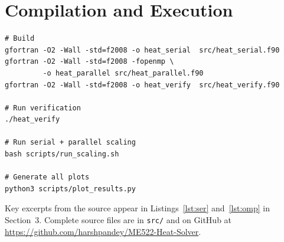 \documentclass[12pt,a4paper]{article}
\begin{document}
\appendix
\section{Compilation and Execution}
\begin{verbatim}
# Build
gfortran -O2 -Wall -std=f2008 -o heat_serial  src/heat_serial.f90
gfortran -O2 -Wall -std=f2008 -fopenmp \
         -o heat_parallel src/heat_parallel.f90
gfortran -O2 -Wall -std=f2008 -o heat_verify  src/heat_verify.f90

# Run verification
./heat_verify

# Run serial + parallel scaling
bash scripts/run_scaling.sh

# Generate all plots
python3 scripts/plot_results.py
\end{verbatim}

Key excerpts from the source appear in Listings~\ref{lst:ser}
and~\ref{lst:omp} in Section~3. Complete source files are in \texttt{src/}
and on GitHub at \url{https://github.com/harshpandey/ME522-Heat-Solver}.
\end{document}
